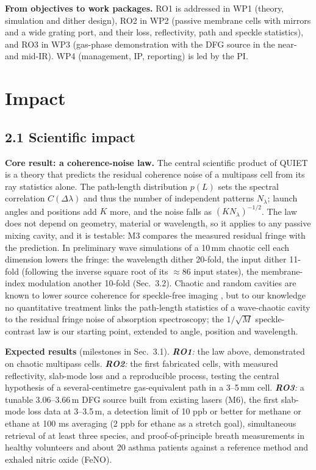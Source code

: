 \documentclass[a4paper,12pt]{article}
\newcommand{\jc}[1]{\textcolor{dkrust}{#1}} %
\newcommand{\hc}[1]{\textcolor{dkplum}{#1}} %
\begin{document}
\textbf{From objectives to work packages.} RO1 is addressed in WP1 (theory, simulation and dither design), RO2 in WP2 (passive membrane cells with mirrors and a wide grating port, and their loss, reflectivity, path and speckle statistics), and RO3 in WP3 (gas-phase demonstration with the DFG source in the near- and mid-IR). WP4 (management, IP, reporting) is led by the PI. %

\section{Impact}

\subsection*{2.1 Scientific impact}
\textbf{Core result: a coherence-noise law.} The central scientific product of QUIET is a theory that predicts the residual coherence noise of a multipass cell from its ray statistics alone. The path-length distribution $p(L)$ sets the spectral correlation $C(\Delta\lambda)$ and thus the number of independent patterns $N_\lambda$; launch angles and positions add $K$ more, and the noise falls as $(KN_\lambda)^{-1/2}$. The law does not depend on geometry, material or wavelength, so it applies to any passive mixing cavity, and it is testable: M3 compares the measured residual fringe with the prediction. \hc{In preliminary wave simulations of a 10\,mm chaotic cell each dimension lowers the fringe: the wavelength dither 20-fold, the input dither 11-fold (following the inverse square root of its $\approx$86 input states), the membrane-index modulation another 10-fold (Sec.~3.2).} Chaotic and random cavities are known to lower source coherence for speckle-free imaging \cite{Redding2012,Cao2019}, but to our knowledge no quantitative treatment links the path-length statistics of a wave-chaotic cavity to the residual fringe noise of absorption spectroscopy; the $1/\sqrt{M}$ speckle-contrast law \cite{Goodman2020} is our starting point, extended to angle, position and wavelength.

\textbf{Expected results} (milestones in Sec.~3.1). \emph{\textbf{RO1}:} the law above, demonstrated on chaotic multipass cells. \emph{\textbf{RO2}:} the first fabricated cells, with measured reflectivity, slab-mode loss and a reproducible process, testing the central hypothesis of a several-centimetre gas-equivalent path in a 3--5\,mm cell. \emph{\textbf{RO3}:} a tunable 3.06--3.66\,\textmu{}m DFG source built from existing lasers (M6), the first slab-mode loss data at 3--3.5\,\textmu{}m, a detection limit of 10 ppb or better for methane or ethane \jc{at 100 ms averaging} (2 ppb for ethane as a stretch goal), simultaneous retrieval of at least three species, and \jc{proof-of-principle breath measurements in healthy volunteers and about 20 asthma patients against a reference method and exhaled nitric oxide (FeNO)}.
\end{document}
